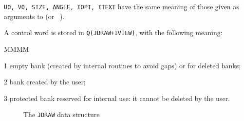 {\tt U0, V0, SIZE, ANGLE, IOPT, ITEXT} have the same meaning
of those given as arguments to  (or ~\cite{bib-HPLOT}).
 
A control word is stored in {\tt Q(JDRAW+IVIEW)}, with the following
meaning:
\begin{DLtt}{MMMM}
\item[1]  empty bank (created by internal routines to avoid gaps) or
for deleted banks;
\item[2]  bank created by the user;
\item[3]  protected bank reserved for internal use: it cannot be deleted by 
the user.
\end{DLtt}
\begin{figure}[hbt]
     \centering
     \caption{The {\tt JDRAW} data structure}
     \label{fg:draw399-1}
\end{figure}
